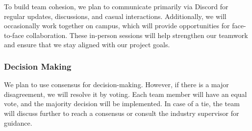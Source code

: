 \documentclass{article}
\begin{document}
To build team cohesion, we plan to communicate primarily via Discord for regular updates, discussions, 
and casual interactions. Additionally, we will occasionally work together on campus, which will provide 
opportunities for face-to-face collaboration. These in-person sessions will help strengthen our teamwork 
and ensure that we stay aligned with our project goals.

\subsubsection*{Decision Making} 

We plan to use consensus for decision-making. However, if there is a major disagreement, we will resolve it by voting. Each team member will have an equal vote, and the majority decision will be implemented. In case of a tie, the team will discuss further to reach a consensus or consult the industry supervisor for guidance.
\end{document}
